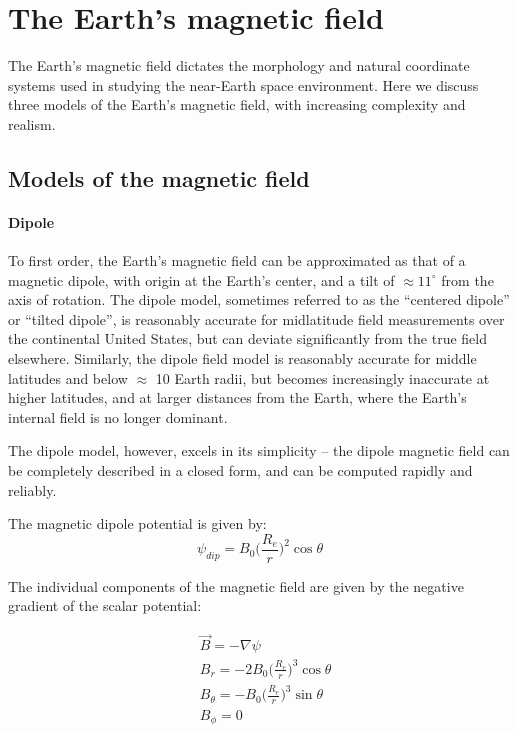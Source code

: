 \section{The Earth's magnetic field}
The Earth's magnetic field dictates the morphology and natural coordinate systems used in studying the near-Earth space environment. Here we discuss three models of the Earth's magnetic field, with increasing complexity and realism.
\subsection{Models of the magnetic field}
\paragraph{Dipole}
\label{section:dipole_model}
To first order, the Earth's magnetic field can be approximated as that of a magnetic dipole, with origin at the Earth's center, and a tilt of $\approx 11^\circ$ from the axis of rotation. The dipole model, sometimes referred to as the ``centered dipole'' or ``tilted dipole'', is reasonably accurate for midlatitude field measurements over the continental United States, but can deviate significantly from the true field elsewhere. Similarly, the dipole field model is reasonably accurate for middle latitudes and below $\approx$ 10 Earth radii, but becomes increasingly inaccurate at higher latitudes, and at larger distances from the Earth, where the Earth's internal field is no longer dominant.

The dipole model, however, excels in its simplicity -- the dipole magnetic field can be completely described in a closed form, and can be computed rapidly and reliably.

The magnetic dipole potential is given by:
\begin{equation}
\psi_{dip} = B_0\big(\frac{R_e}{r}\big)^2\cos\theta
\end{equation}

The individual components of the magnetic field are given by the negative gradient of the scalar potential:

\begin{eqnarray}
& \vec{B} = -\nabla \psi \\
& B_r = -2 B_0\big(\frac{R_e}{r}\big)^3\cos\theta \\
& B_{\theta} = -B_0\big(\frac{R_e}{r}\big)^3 \sin\theta \\ 
& B_\phi = 0
\end{eqnarray}

